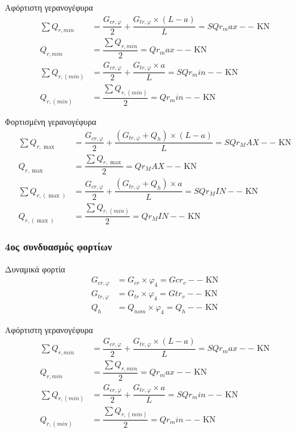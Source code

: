 Αφόρτιστη γερανογέφυρα
\begin{align*}
\sum{Q_{r,min}}   &= \dfrac{G_{cr,φ}}{2} + \dfrac{G_{tr,φ} \times (L - a)}{L} = SQr_max-- \text{ KN} \\
Q_{r,min}         &= \dfrac{\displaystyle\sum{Q_{r,min}}}{2}                  = Qr_max--  \text{ KN} \\
\sum{Q_{r,(min)}} &= \dfrac{G_{cr,φ}}{2} + \dfrac{G_{tr,φ} \times a}{L}       = SQr_min-- \text{ KN} \\
Q_{r,(min)}       &= \dfrac{\displaystyle\sum{Q_{r,(min)}}}{2}                = Qr_min--  \text{ KN}
\end{align*}

Φορτισμένη γερανογέφυρα
\begin{align*}
\sum{Q_{r,\max}}     &= \dfrac{G_{cr,φ}}{2} + \dfrac{(G_{tr,φ} + Q_h) \times (L - a)}{L}   = SQr_MAX-- \text{ KN} \\
Q_{r,\max}           &= \dfrac{\displaystyle\sum{Q_{r,\max}}}{2}                           = Qr_MAX--  \text{ KN} \\
\sum{Q_{r,(\max)}}   &= \dfrac{G_{cr,φ}}{2} + \dfrac{(G_{tr,φ} + Q_h) \times a}{L}         = SQr_MIN-- \text{ KN} \\
Q_{r,(\max)}         &= \dfrac{\displaystyle\sum{Q_{r,(min)}}}{2}                          = Qr_MIN-- \text{ KN}
\end{align*}

\subsubsection{4ος συνδυασμός φορτίων}
Δυναμικά  φορτία
\begin{align*}
G_{cr,φ}  &= G_{cr} \times φ_4    = Gcr_v-- \text{ KN} \\
G_{tr,φ}  &= G_{tr} \times φ_4    = Gtr_v-- \text{ KN} \\
Q_h       &= Q_{nom} \times φ_4   = Q_h--   \text{ KN}
\end{align*}

Αφόρτιστη γερανογέφυρα
\begin{align*}
\sum{Q_{r,min}}   &= \dfrac{G_{cr,φ}}{2} + \dfrac{G_{tr,φ} \times (L - a)}{L} = SQr_max-- \text{ KN} \\
Q_{r,min}         &= \dfrac{\displaystyle\sum{Q_{r,min}}}{2}                  = Qr_max--  \text{ KN} \\
\sum{Q_{r,(min)}} &= \dfrac{G_{cr,φ}}{2} + \dfrac{G_{tr,φ} \times a}{L}       = SQr_min-- \text{ KN} \\
Q_{r,(min)}       &= \dfrac{\displaystyle\sum{Q_{r,(min)}}}{2}                = Qr_min--  \text{ KN}
\end{align*}

